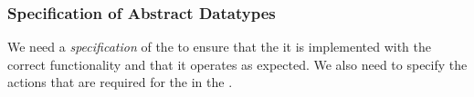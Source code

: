 \subsubsection{Specification of Abstract Datatypes}\label{subsubsec:Specification_Abstract_Datatype}
\begin{definition}[Specification]\label{def:ADT_Specification}
  We need a \emph{specification} of the  to ensure that the it is implemented with the correct functionality and that it operates as expected.
  We also need to specify the actions that are required for the  in the .
\end{definition}













